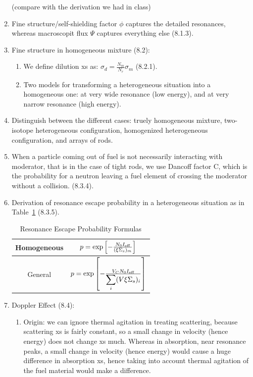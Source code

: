 \documentclass{school-22.211-notes}
\begin{document}
\begin{enumerate}
(compare with the derivation we had in class)
\item Fine structure/self-shielding factor $\phi$ captures the detailed resonances, whereas macroscopit flux $\Psi$ captures everything else (8.1.3).
\item Fine structure in homogeneous mixture (8.2):
  \begin{enumerate}
    \item We define dilution xs as: $\sigma_d = \frac{N_m}{N_r} \sigma_m$ (8.2.1). 
    \item Two models for transforming a heterogeneous situation into a homogeneous one: 
      at very wide resonance (low energy), and at very narrow resonance (high energy). 
  \end{enumerate}
\item Distinguish between the different cases: truely homogeneous mixture, two-isotope heterogeneous configuration, homogenized heterogeneous configuration, and arrays of rods. 
\item When a particle coming out of fuel is not necessarily interacting with moderator, that is in the case of tight rods, we use Dancoff factor C, which is the probability for a neutron leaving a fuel element of crossing the moderator without a collision. (8.3.4).
\item Derivation of resonance escape probability in a heterogeneous situation as in Table~\ref{p-formulas} (8.3.5).
\begin{table}
  \centering
  \begin{tabular}{|c|c|} \hline
    Homogeneous & $p = \exp \left[ - \frac{N_0 I_{\mathrm{eff}}}{(\xi \Sigma_s)_m}  \right]$ \\ \hline
    General & $p = \exp \left[ - \frac{V_C N_0 I_{\mathrm{eff}}}{\displaystyle\sum_i (V \xi \Sigma_s)_i}  \right]$ \\  \hline
  \end{tabular}
  \caption{Resonance Escape Probability Formulas} \label{p-formulas}
\end{table}
\item Doppler Effect (8.4):
\begin{enumerate}
\item Origin: we can ignore thermal agitation in treating scattering, because scattering xs is fairly constant, so a small change in velocity (hence energy) does not change xs much. Whereas in absorption, near resonance peaks, a small change in velocity (hence energy) would cause a huge difference in absorption xs, hence taking into account thermal agitation of the fuel material would make a difference. 

\end{enumerate}
\end{enumerate}
\end{document}

